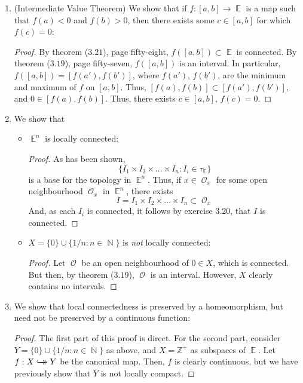 \documentclass{book}
\DeclareMathOperator*{\N}{\mathbb{N}}
\DeclareMathOperator*{\E}{\mathbb{E}}
\DeclareMathOperator*{\Ocal}{\mathcal{O}}
\newcommand{\bij}{\mathrel{\hookrightarrow\hspace{-1.8ex}\to}} %
\begin{document}
\begin{enumerate}[(1)]
    \item (Intermediate Value Theorem) We show that if $f: [a,b] \rightarrow \E$ is a map such that $f(a) < 0$ and $f(b) > 0$, then there exists some $c \in [a,b]$ for which $f(c) = 0$: 
        \begin{proof} By theorem ($3.21$), page fifty-eight, $f([a,b]) \subset \E$ is connected. By theorem ($3.19$), page fifty-seven, $f([a,b])$ is an interval. In particular, $f([a,b]) = [f(a'), f(b')]$, where $f(a')$, $f(b')$, are the minimum and maximum of $f$ on $[a,b]$. Thus, $[f(a), f(b)] \subset [f(a'), f(b')] $, and $0 \in [f(a), f(b)]$. Thus, there exists $c \in [a,b]$, $f(c) = 0$. 
        \end{proof}

    \item We show that
        \begin{itemize}
            \item $\E^n$ is locally connected: 
                \begin{proof} As has been shown, 
                    \[ \{I_1 \times I_2 \times \dots \times I_n : I_i \in \tau_{\E} \}\]
                    is a base for the topology in $\E^n$. Thus, if $x \in \Ocal_x$ for some open neighbourhood $\Ocal_x$ in $\E^n$, there exists 
                    \[I = I_1 \times I_2 \times \dots \times I_n \subset \Ocal_x\]
                    And, as each $I_i$ is connected, it follows by exercise 3.20, that $I$ is connected. 
                \end{proof}

            \item $X = \{0\} \cup \{1/n : n \in \N\}$ is \textit{not} locally connected: 
                \begin{proof} Let $\Ocal$ be an open neighbourhood of $0 \in X$, which is connected. But then, by theorem ($3.19$), $\Ocal$ is an interval. However, $X$ clearly contains no intervals. 
                \end{proof}
        \end{itemize}

    \item We show that local connectedness is preserved by a homeomorphism, but need not be preserved by a continuous function: 
        \begin{proof} The first part of this proof is direct. For the second part, consider $Y = \{0\} \cup \{1/n: n \in \N\}$ as above, and $X = \mathbb{Z}^+$ as subspaces of $\E$. Let $f: X  \bij Y$ be the canonical map. Then, $f$ is clearly continuous, but we have previously show that $Y$ is not locally compact. 
        \end{proof}


\end{enumerate}
\end{document}

